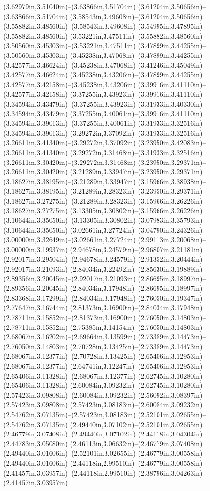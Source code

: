 (3.62979in,3.51040in)--(3.63866in,3.51704in) (3.61204in,3.50656in)--(3.63866in,3.51704in) (3.58543in,3.49608in)--(3.61204in,3.50656in) (3.55882in,3.48560in)--(3.58543in,3.49608in) (3.54995in,3.47895in)--(3.55882in,3.48560in) (3.53221in,3.47511in)--(3.55882in,3.48560in) (3.50560in,3.45303in)--(3.53221in,3.47511in) (3.47899in,3.44255in)--(3.50560in,3.45303in) (3.45238in,3.47068in)--(3.47899in,3.44255in) (3.42577in,3.46624in)--(3.45238in,3.47068in) (3.41246in,3.45049in)--(3.42577in,3.46624in) (3.45238in,3.43206in)--(3.47899in,3.44255in) (3.42577in,3.42158in)--(3.45238in,3.43206in) (3.39916in,3.41110in)--(3.42577in,3.42158in) (3.37255in,3.43923in)--(3.39916in,3.41110in) (3.34594in,3.43479in)--(3.37255in,3.43923in) (3.31933in,3.40330in)--(3.34594in,3.43479in) (3.37255in,3.40061in)--(3.39916in,3.41110in) (3.34594in,3.39013in)--(3.37255in,3.40061in) (3.31933in,3.32516in)--(3.34594in,3.39013in) (3.29272in,3.37092in)--(3.31933in,3.32516in) (3.26611in,3.41340in)--(3.29272in,3.37092in) (3.23950in,3.42083in)--(3.26611in,3.41340in) (3.29272in,3.31468in)--(3.31933in,3.32516in) (3.26611in,3.30420in)--(3.29272in,3.31468in) (3.23950in,3.29371in)--(3.26611in,3.30420in) (3.21289in,3.33947in)--(3.23950in,3.29371in) (3.18627in,3.38195in)--(3.21289in,3.33947in) (3.15966in,3.38938in)--(3.18627in,3.38195in) (3.21289in,3.28323in)--(3.23950in,3.29371in) (3.18627in,3.27275in)--(3.21289in,3.28323in) (3.15966in,3.26226in)--(3.18627in,3.27275in) (3.13305in,3.30802in)--(3.15966in,3.26226in) (3.10644in,3.35050in)--(3.13305in,3.30802in) (3.07983in,3.35793in)--(3.10644in,3.35050in) (3.02661in,3.27724in)--(3.04790in,3.24326in) (3.00000in,3.32649in)--(3.02661in,3.27724in) (2.99113in,3.20068in)--(3.00000in,3.19937in) (2.94678in,3.24579in)--(2.96807in,3.21181in) (2.92017in,3.29504in)--(2.94678in,3.24579in) (2.91352in,3.20444in)--(2.92017in,3.21093in) (2.84034in,3.22492in)--(2.85630in,3.19889in) (2.89356in,3.20045in)--(2.92017in,3.21093in) (2.86695in,3.18997in)--(2.89356in,3.20045in) (2.84034in,3.17948in)--(2.86695in,3.18997in) (2.83368in,3.17299in)--(2.84034in,3.17948in) (2.76050in,3.19347in)--(2.77647in,3.16744in) (2.81373in,3.16900in)--(2.84034in,3.17948in) (2.78711in,3.15852in)--(2.81373in,3.16900in) (2.76050in,3.14803in)--(2.78711in,3.15852in) (2.75385in,3.14154in)--(2.76050in,3.14803in) (2.68067in,3.16202in)--(2.69664in,3.13599in) (2.73389in,3.14473in)--(2.76050in,3.14803in) (2.70728in,3.13425in)--(2.73389in,3.14473in) (2.68067in,3.12377in)--(2.70728in,3.13425in) (2.65406in,3.12953in)--(2.68067in,3.12377in) (2.64741in,3.12247in)--(2.65406in,3.12953in) (2.65406in,3.11328in)--(2.68067in,3.12377in) (2.62745in,3.10280in)--(2.65406in,3.11328in) (2.60084in,3.09232in)--(2.62745in,3.10280in) (2.57423in,3.09808in)--(2.60084in,3.09232in) (2.56092in,3.08397in)--(2.57423in,3.09808in) (2.57423in,3.08183in)--(2.60084in,3.09232in) (2.54762in,3.07135in)--(2.57423in,3.08183in) (2.52101in,3.02655in)--(2.54762in,3.07135in) (2.49440in,3.07102in)--(2.52101in,3.02655in) (2.46779in,3.07408in)--(2.49440in,3.07102in) (2.44118in,3.04304in)--(2.44783in,3.05080in) (2.46113in,3.06632in)--(2.46779in,3.07408in) (2.49440in,3.01606in)--(2.52101in,3.02655in) (2.46779in,3.00558in)--(2.49440in,3.01606in) (2.44118in,2.99510in)--(2.46779in,3.00558in) (2.41457in,3.03957in)--(2.44118in,2.99510in) (2.38796in,3.04263in)--(2.41457in,3.03957in) 